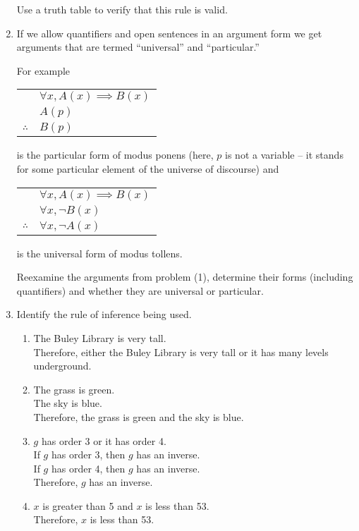 \begin{enumerate}
Use a truth table to verify that this rule is valid.

\item If we allow quantifiers and open sentences in an argument form we
get arguments that are termed ``universal'' and ``particular.''

For example  \begin{tabular}{cl}
 & $\forall x, A(x) \implies B(x)$ \\
 & $A(p)$ \\ \hline
$\therefore$ & $B(p)$ \\
\end{tabular}  is the particular form of modus ponens (here, $p$
is not a variable -- it stands for some particular element of the universe of
discourse)
and \begin{tabular}{cl}
 & $\forall x, A(x) \implies B(x)$ \\
 & $\forall x, \lnot B(x)$ \\ \hline
$\therefore$ & $\forall x, \lnot A(x)$ \\
\end{tabular} is the universal form of modus tollens.

Reexamine the arguments from problem (1), determine their forms
(including quantifiers) and whether they are universal or particular.

\item Identify the rule of inference being used.

\begin{enumerate}
\item The Buley Library is very tall.\\
Therefore, either the Buley Library is very tall or it has many
levels underground.

\item The grass is green.\\
The sky is blue.\\
Therefore, the grass is green and the sky is blue.

\item $g$ has order 3 or it has order 4.\\
If $g$ has order 3, then $g$ has an inverse.\\
If $g$ has order 4, then $g$ has an inverse.\\
Therefore, $g$ has an inverse.

\item $x$ is greater than 5 and $x$ is less than 53.\\
Therefore, $x$ is less than 53.


\end{enumerate}
\end{enumerate}
